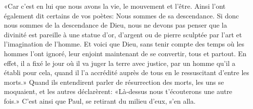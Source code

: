 «Car c’est en lui que nous avons la vie, le mouvement et l’être.
Ainsi l’ont également dit certains de vos poètes:
	Nous sommes de sa descendance.
Si donc nous sommes de la descendance de Dieu,
	nous ne devons pas penser
		que la divinité est pareille à une statue d’or, d’argent ou de pierre
	sculptée par l’art et l’imagination de l’homme.
Et voici que Dieu, sans tenir compte des temps où les hommes l’ont ignoré,
	leur enjoint maintenant de se convertir, tous et partout.
En effet, il a fixé le jour où il va juger la terre avec justice,
	par un homme qu’il a établi pour cela,
	quand il l’a accrédité auprès de tous en le ressuscitant d’entre les morts.»
Quand ils entendirent parler de résurrection des morts,
	les uns se moquaient, et les autres déclarèrent:
	«Là-dessus nous t’écouterons une autre fois.»
C’est ainsi que Paul, se retirant du milieu d’eux, s’en alla.
